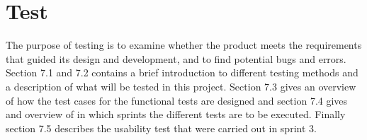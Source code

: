 \chapter{Test}

	The purpose of testing is to examine whether the product meets the requirements that guided its design and development, and to find potential bugs and errors. Section 7.1 and 7.2 contains a brief introduction to different testing methods and a description of what will be tested in this project. Section 7.3 gives an overview of how the test cases for the functional tests are designed and section 7.4 gives and overview of in which sprints the different tests are to be executed. Finally section 7.5 describes the usability test that were carried out in sprint 3.